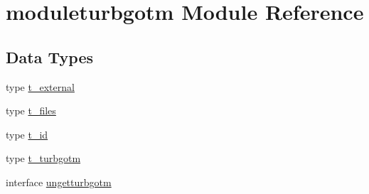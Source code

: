 \hypertarget{namespacemoduleturbgotm}{}\section{moduleturbgotm Module Reference}
\label{namespacemoduleturbgotm}
\subsection*{Data Types}
\begin{DoxyCompactItemize}
\item 
type \mbox{\hyperlink{structmoduleturbgotm_1_1t__external}{t\+\_\+external}}
\item 
type \mbox{\hyperlink{structmoduleturbgotm_1_1t__files}{t\+\_\+files}}
\item 
type \mbox{\hyperlink{structmoduleturbgotm_1_1t__id}{t\+\_\+id}}
\item 
type \mbox{\hyperlink{structmoduleturbgotm_1_1t__turbgotm}{t\+\_\+turbgotm}}
\item 
interface \mbox{\hyperlink{interfacemoduleturbgotm_1_1ungetturbgotm}{ungetturbgotm}}
\end{DoxyCompactItemize}
